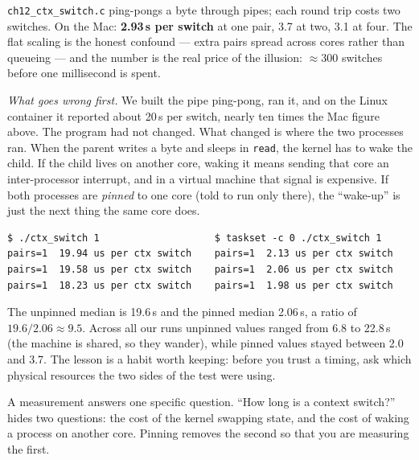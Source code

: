 \begin{example}
\texttt{ch12\_ctx\_switch.c} ping-pongs a byte through pipes; each
round trip costs two switches. On the Mac: \textbf{2.93\,\textmu s
per switch} at one pair, 3.7 at two, 3.1 at four. The flat scaling
is the honest confound --- extra pairs spread across cores rather
than queueing --- and the number is the real price of the illusion:
$\approx$300 switches before one millisecond is spent.
\end{example}



\begin{example}
\emph{What goes wrong first.} We built the pipe ping-pong, ran it,
and on the Linux container it reported about 20\,\textmu s per
switch, nearly ten times the Mac figure above. The program had not
changed. What changed is where the two processes ran. When the
parent writes a byte and sleeps in \texttt{read}, the kernel has to
wake the child. If the child lives on another core, waking it means
sending that core an inter-processor interrupt, and in a virtual
machine that signal is expensive. If both processes are \emph{pinned}
to one core (told to run only there), the ``wake-up'' is just the
next thing the same core does.

\begin{lstlisting}[basicstyle=\ttfamily\scriptsize,caption={Real runs on the
Linux x86\_64 container, three each; the \texttt{taskset -c 0} prefix pins the
program and its children to CPU 0.}]
$ ./ctx_switch 1                    $ taskset -c 0 ./ctx_switch 1
pairs=1  19.94 us per ctx switch    pairs=1  2.13 us per ctx switch
pairs=1  19.58 us per ctx switch    pairs=1  2.06 us per ctx switch
pairs=1  18.23 us per ctx switch    pairs=1  1.98 us per ctx switch
\end{lstlisting}

The unpinned median is 19.6\,\textmu s and the pinned median 2.06\,\textmu s,
a ratio of $19.6/2.06\approx 9.5$. Across all our runs unpinned
values ranged from 6.8 to 22.8\,\textmu s (the machine is shared, so
they wander), while pinned values stayed between 2.0 and 3.7. The
lesson is a habit worth keeping: before you trust a timing, ask which
physical resources the two sides of the test were using.
\end{example}

\begin{principle}
A measurement answers one specific question. ``How long is a context
switch?'' hides two questions: the cost of the kernel swapping
state, and the cost of waking a process on another core. Pinning
removes the second so that you are measuring the first.
\end{principle}

